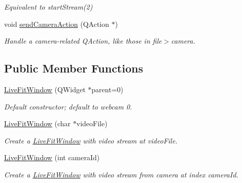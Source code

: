 \begin{DoxyCompactItemize}
\begin{DoxyCompactList}\small\item\em Equivalent to start\+Stream(2) \end{DoxyCompactList}\item 
void \hyperlink{classLiveFitWindow_aa705a48360d8bfdfe539671c8b1fa1dc}{send\+Camera\+Action} (Q\+Action $\ast$)\hypertarget{classLiveFitWindow_aa705a48360d8bfdfe539671c8b1fa1dc}{}\label{classLiveFitWindow_aa705a48360d8bfdfe539671c8b1fa1dc}

\begin{DoxyCompactList}\small\item\em Handle a camera-\/related Q\+Action, like those in file$>$camera. \end{DoxyCompactList}\end{DoxyCompactItemize}
\subsection*{Public Member Functions}
\begin{DoxyCompactItemize}
\item 
\hyperlink{classLiveFitWindow_ab3c12b13b746248a2f0063298ac55ca0}{Live\+Fit\+Window} (Q\+Widget $\ast$parent=0)\hypertarget{classLiveFitWindow_ab3c12b13b746248a2f0063298ac55ca0}{}\label{classLiveFitWindow_ab3c12b13b746248a2f0063298ac55ca0}

\begin{DoxyCompactList}\small\item\em Default constructor; default to webcam 0. \end{DoxyCompactList}\item 
\hyperlink{classLiveFitWindow_a5bfe4989746c47ba2c17d7e834d95011}{Live\+Fit\+Window} (char $\ast$video\+File)\hypertarget{classLiveFitWindow_a5bfe4989746c47ba2c17d7e834d95011}{}\label{classLiveFitWindow_a5bfe4989746c47ba2c17d7e834d95011}

\begin{DoxyCompactList}\small\item\em Create a \hyperlink{classLiveFitWindow}{Live\+Fit\+Window} with video stream at video\+File. \end{DoxyCompactList}\item 
\hyperlink{classLiveFitWindow_a811abb5e301bd43d0930bc1330e0bf2a}{Live\+Fit\+Window} (int camera\+Id)\hypertarget{classLiveFitWindow_a811abb5e301bd43d0930bc1330e0bf2a}{}\label{classLiveFitWindow_a811abb5e301bd43d0930bc1330e0bf2a}

\begin{DoxyCompactList}\small\item\em Create a \hyperlink{classLiveFitWindow}{Live\+Fit\+Window} with video stream from camera at index camera\+Id. \end{DoxyCompactList}\end{DoxyCompactItemize}
